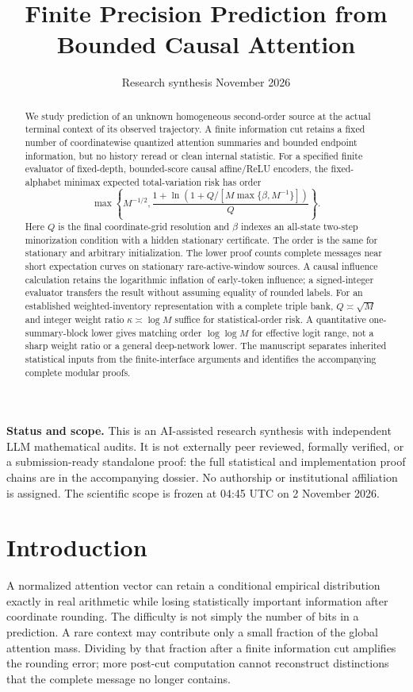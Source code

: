 \documentclass[11pt,letterpaper]{article}
\title{\vspace{-1.4em}Finite Precision Prediction from\\Bounded Causal Attention}
\author{}
\date{Research synthesis\quad 2 November 2026}
\theoremstyle{definition}\newtheorem{definition}[theorem]{Definition}
\theoremstyle{remark}\newtheorem{remark}[theorem]{Remark}
\begin{document}
\maketitle\vspace{-1.4em}
\begin{abstract}
We study prediction of an unknown homogeneous second-order source at the actual terminal context of its observed trajectory. A finite information cut retains a fixed number of coordinatewise quantized attention summaries and bounded endpoint information, but no history reread or clean internal statistic. For a specified finite evaluator of fixed-depth, bounded-score causal affine/ReLU encoders, the fixed-alphabet minimax expected total-variation risk has order
\[
 \max\left\{M^{-1/2},\frac{1+\ln(1+Q/[M\max\{\beta,M^{-1}\}])}{Q}\right\}.
\]
Here $Q$ is the final coordinate-grid resolution and $\beta$ indexes an all-state two-step minorization condition with a hidden stationary certificate. The order is the same for stationary and arbitrary initialization. The lower proof counts complete messages near short expectation curves on stationary rare-active-window sources. A causal influence calculation retains the logarithmic inflation of early-token influence; a signed-integer evaluator transfers the result without assuming equality of rounded labels. For an established weighted-inventory representation with a complete triple bank, $Q\asymp\sqrt M$ and integer weight ratio $\kappa\asymp\log M$ suffice for statistical-order risk. A quantitative one-summary-block lower gives matching order $\log\log M$ for effective logit range, not a sharp weight ratio or a general deep-network lower. The manuscript separates inherited statistical inputs from the finite-interface arguments and identifies the accompanying complete modular proofs.
\end{abstract}
\noindent\textbf{Status and scope.} This is an AI-assisted research synthesis with independent LLM mathematical audits. It is not externally peer reviewed, formally verified, or a submission-ready standalone proof: the full statistical and implementation proof chains are in the accompanying dossier. No authorship or institutional affiliation is assigned. The scientific scope is frozen at 04:45 UTC on 2 November 2026.

\section{Introduction}
A normalized attention vector can retain a conditional empirical distribution exactly in real arithmetic while losing statistically important information after coordinate rounding. The difficulty is not simply the number of bits in a prediction. A rare context may contribute only a small fraction of the global attention mass. Dividing by that fraction after a finite information cut amplifies the rounding error; more post-cut computation cannot reconstruct distinctions that the complete message no longer contains.
\end{document}
